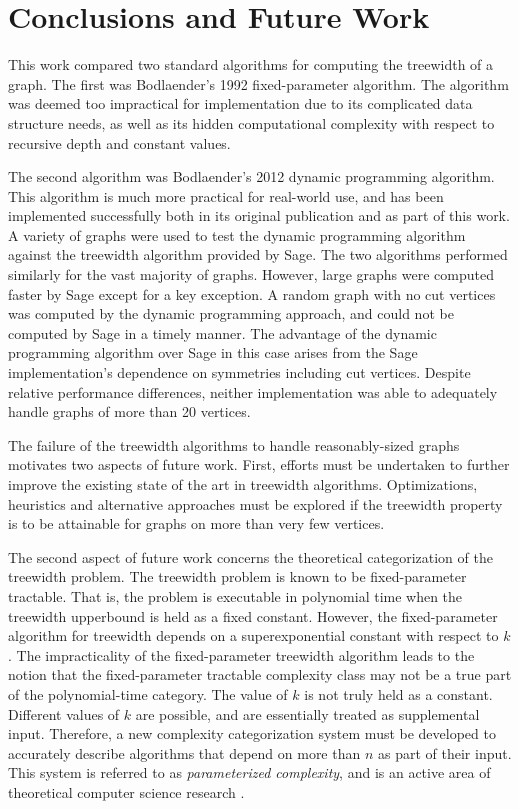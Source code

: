 \documentclass[12pt,conference]{IEEEtran}
\theoremstyle{plain}
\begin{document}
\section{Conclusions and Future Work}

This work compared two standard algorithms for computing the treewidth of a graph. The first was Bodlaender's 1992 fixed-parameter algorithm. The algorithm was deemed too impractical for implementation due to its complicated data structure needs, as well as its hidden computational complexity with respect to recursive depth and constant values. 

The second algorithm was Bodlaender's 2012 dynamic programming algorithm. This algorithm is much more practical for real-world use, and has been implemented successfully both in its original publication and as part of this work. A variety of graphs were used to test the dynamic programming algorithm against the treewidth algorithm provided by Sage. The two algorithms performed similarly for the vast majority of graphs. However, large graphs were computed faster by Sage except for a key exception. A random graph with no cut vertices was computed by the dynamic programming approach, and could not be computed by Sage in a timely manner. The advantage of the dynamic programming algorithm over Sage in this case arises from the Sage implementation's dependence on symmetries including cut vertices. Despite relative performance differences, neither implementation was able to adequately handle graphs of more than 20 vertices. 

The failure of the treewidth algorithms to handle reasonably-sized graphs motivates two aspects of future work. First, efforts must be undertaken to further improve the existing state of the art in treewidth algorithms. Optimizations, heuristics and alternative approaches must be explored if the treewidth property is to be attainable for graphs on more than very few vertices.

The second aspect of future work concerns the theoretical categorization of the treewidth problem. The treewidth problem is known to be fixed-parameter tractable. That is, the problem is executable in polynomial time when the treewidth upperbound is held as a fixed constant. However, the fixed-parameter algorithm for treewidth depends on a superexponential constant with respect to $k$. The impracticality of the fixed-parameter treewidth algorithm leads to the notion that the fixed-parameter tractable complexity class may not be a true part of the polynomial-time category. The value of $k$ is not truly held as a constant. Different values of $k$ are possible, and are essentially treated as supplemental input. Therefore, a new complexity categorization system must be developed to accurately describe algorithms that depend on more than $n$ as part of their input. This system is referred to as \textit{parameterized complexity}, and is an active area of theoretical computer science research \cite{downey-fellows}.
\end{document}
